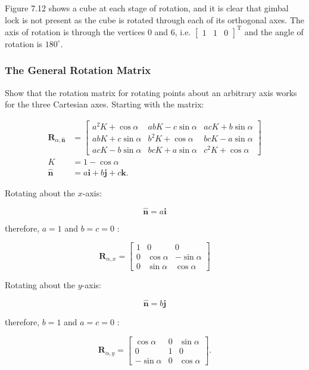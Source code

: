 \documentclass[10pt]{article}
\begin{document}
Figure 7.12 shows a cube at each stage of rotation, and it is clear that gimbal lock is not present as the cube is rotated through each of its orthogonal axes. The axis of rotation is through the vertices 0 and 6, i.e. $\left[\begin{array}{ccc}1 & 1 & 0\end{array}\right]^{\mathrm{T}}$ and the angle of rotation is $180^{\circ}$.

\subsubsection{The General Rotation Matrix}
Show that the rotation matrix for rotating points about an arbitrary axis works for the three Cartesian axes. Starting with the matrix:

$$
\begin{aligned}
\mathbf{R}_{\alpha, \hat{\mathbf{n}}} & =\left[\begin{array}{ccc}
a^{2} K+\cos \alpha & a b K-c \sin \alpha & a c K+b \sin \alpha \\
a b K+c \sin \alpha & b^{2} K+\cos \alpha & b c K-a \sin \alpha \\
a c K-b \sin \alpha & b c K+a \sin \alpha & c^{2} K+\cos \alpha
\end{array}\right] \\
K & =1-\cos \alpha \\
\hat{\mathbf{n}} & =a \mathbf{i}+b \mathbf{j}+c \mathbf{k} .
\end{aligned}
$$

Rotating about the $x$-axis:

$$
\hat{\mathbf{n}}=a \mathbf{i}
$$

therefore, $a=1$ and $b=c=0$ :

$$
\mathbf{R}_{\alpha, x}=\left[\begin{array}{ccc}
1 & 0 & 0 \\
0 & \cos \alpha & -\sin \alpha \\
0 & \sin \alpha & \cos \alpha
\end{array}\right]
$$

Rotating about the $y$-axis:

$$
\hat{\mathbf{n}}=b \mathbf{j}
$$

therefore, $b=1$ and $a=c=0$ :

$$
\mathbf{R}_{\alpha, y}=\left[\begin{array}{ccc}
\cos \alpha & 0 & \sin \alpha \\
0 & 1 & 0 \\
-\sin \alpha & 0 & \cos \alpha
\end{array}\right] .
$$
\end{document}
